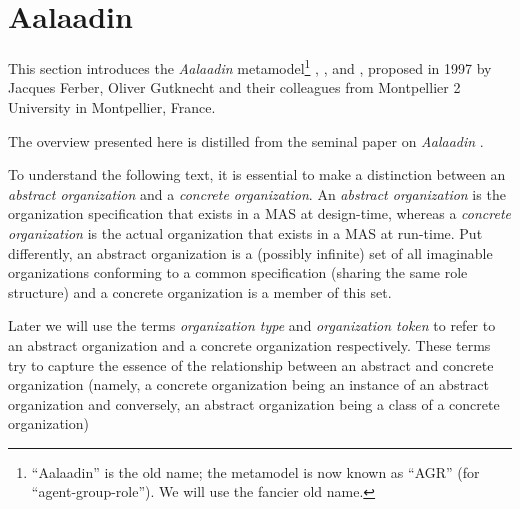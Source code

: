 
\section{Aalaadin}

This section introduces the \textit{Aalaadin} metamodel\footnote{``Aalaadin'' is the old name; the metamodel is now known as ``AGR'' (for ``agent-group-role''). We will use the fancier old name.} \cite{Ferber97}, \cite{Ferber98}, \cite{Ferber00} and \cite{Ferber03}, proposed in 1997 by Jacques Ferber, Oliver Gutknecht and their colleagues from Montpellier 2 University in Montpellier, France.

The overview presented here is distilled from the seminal paper on \textit{Aalaadin} \cite{Ferber97}.


To understand the following text, it is essential to make a distinction between an \textit{abstract organization} and a \textit{concrete organization}.
An \textit{abstract organization} is the organization specification that exists in a MAS at design-time, whereas a \textit{concrete organization} is the actual organization that exists in a MAS at run-time.
Put differently, an abstract organization is a (possibly infinite) set of all imaginable organizations conforming to a common specification (sharing the same role structure) and a concrete organization is a member of this set.

Later we will use the terms \textit{organization type} and \textit{organization token} to refer to an abstract organization and a concrete organization respectively.
These terms try to capture the essence of the relationship between an abstract and concrete organization (namely, a concrete organization being an instance of an abstract organization and conversely, an abstract organization being a class of a concrete organization)

